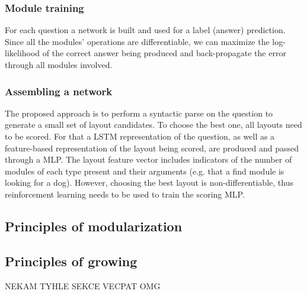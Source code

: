 \documentclass[a4paper,twocolumn]{article}
\begin{document}
\subsubsection*{Module training}
For each question a network is built and used for a label (answer) prediction.  Since all the modules' operations are differentiable, we can maximize the log-likelihood of the correct answer being produced and back-propagate the error through all modules involved.

\subsubsection*{Assembling a network}
    The proposed approach is to perform a syntactic parse on the question to generate a small set of layout candidates. To choose the best one, all layouts need to be scored. For that a LSTM representation of the question, as well as a feature-based representation of the layout being scored, are produced and passed through a MLP. The layout feature vector includes indicators of the number of modules of each type present and their arguments (e.g. that a find module is looking for a dog).
 However, choosing the best layout is non-differentiable, thus reinforcement learning needs to be used to train the scoring MLP.

\subsection*{Principles of modularization}
\subsection*{Principles of growing}
NEKAM TYHLE SEKCE VECPAT OMG
\end{document}
